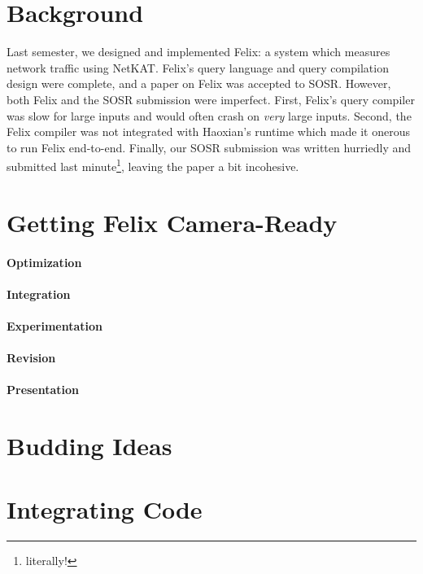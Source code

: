 \section{Background}
Last semester, we designed and implemented Felix: a system which measures
network traffic using NetKAT. Felix's query language and query compilation
design were complete, and a paper on Felix was accepted to SOSR. However,
both Felix and the SOSR submission were imperfect. First, Felix's query
compiler was slow for large inputs and would often crash on \emph{very} large
inputs. Second, the Felix compiler was not integrated with Haoxian's runtime
which made it onerous to run Felix end-to-end. Finally, our SOSR submission was
written hurriedly and submitted last minute\footnote{literally!}, leaving the
paper a bit incohesive.

\section{Getting Felix Camera-Ready}
\paragraph{Optimization}

\paragraph{Integration}

\paragraph{Experimentation}

\paragraph{Revision}

\paragraph{Presentation}

\section{Budding Ideas}

\section{Integrating Code}
